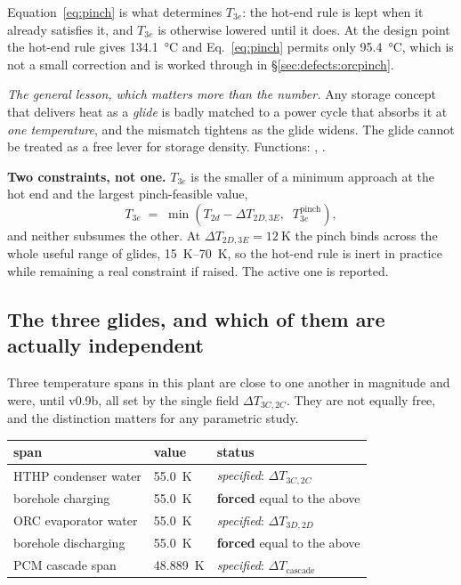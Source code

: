 Equation~\eqref{eq:pinch} is what determines $T_{3e}$: the hot-end rule is kept
when it already satisfies it, and $T_{3e}$ is otherwise lowered until it does.
At the design point the hot-end rule gives \SI{134.1}{\celsius} and
Eq.~\eqref{eq:pinch} permits only \SI{95.4}{\celsius}, which is not a small
correction and is worked through in \S\ref{sec:defects:orcpinch}.

\emph{The general lesson, which matters more than the number.} Any storage
concept that delivers heat as a \emph{glide} is badly matched to a power cycle
that absorbs it at \emph{one temperature}, and the mismatch tightens as the
glide widens. The glide cannot be treated as a free lever for storage density.
Functions: , .

\medskip
\noindent\textbf{Two constraints, not one.} $T_{3e}$ is the smaller of a
minimum approach at the hot end and the largest pinch-feasible value,
\begin{equation}
  T_{3e} \;=\; \min\!\left(T_{2d}-\Delta T_{2D,3E},\;\;
                            T_{3e}^{\mathrm{pinch}}\right),
  \label{eq:T3e-min}
\end{equation}
and neither subsumes the other. At $\Delta T_{2D,3E}=\SI{12}{\kelvin}$ the
pinch binds across the whole useful range of glides, \SIrange{15}{70}{\kelvin},
so the hot-end rule is inert in practice while remaining a real constraint if
raised. The active one is reported.

\subsection{The three glides, and which of them are actually independent}
\label{sec:cycles:glides}

Three temperature spans in this plant are close to one another in magnitude and
were, until v0.9b, all set by the single field $\Delta T_{3C,2C}$. They are not
equally free, and the distinction matters for any parametric study.

\begin{center}
\begin{tabular}{@{}l l l@{}}
\toprule
span & value & status \\
\midrule
HTHP condenser water   & \SI{55.0}{\kelvin} & \emph{specified}: $\Delta T_{3C,2C}$ \\
borehole charging      & \SI{55.0}{\kelvin} & \textbf{forced} equal to the above \\
ORC evaporator water   & \SI{55.0}{\kelvin} & \emph{specified}: $\Delta T_{3D,2D}$ \\
borehole discharging   & \SI{55.0}{\kelvin} & \textbf{forced} equal to the above \\
PCM cascade span       & \SI{48.889}{\kelvin} & \emph{specified}: $\Delta T_{\mathrm{cascade}}$ \\
\bottomrule
\end{tabular}
\end{center}

